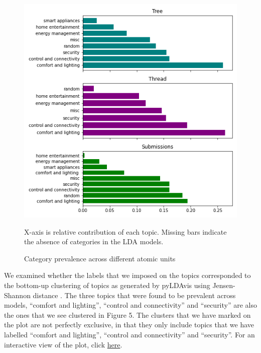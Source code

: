 \documentclass{article}
\begin{document}
    \begin{figure}[H]
        \begin{centering}
        \includegraphics[width = \textwidth]{../Figure/Topic_Prevalence.png}
        \caption{Category prevalence across different atomic units}
        \end{centering}
        \begin{footnotesize} 
            X-axis is relative contribution of each topic. Missing bars indicate the absence of categories in the LDA models. 
        \end{footnotesize}
    \end{figure}
    
    We examined whether the labels that we imposed on the topics corresponded to the bottom-up clustering of topics as generated by pyLDAvis using Jensen-Shannon distance \cite{sievert2014ldavis}. The three topics that were found to be prevalent across models, “comfort and lighting”, “control and connectivity” and “security” are also the ones that we see clustered in Figure 5. The clusters that we have marked on the plot are not perfectly exclusive, in that they only include topics that we have labelled “comfort and lighting”, “control and connectivity” and “security”. For an interactive view of the plot, click \href{https://tinyurl.com/y9ncgo5b}{here}.
    
\end{document}

